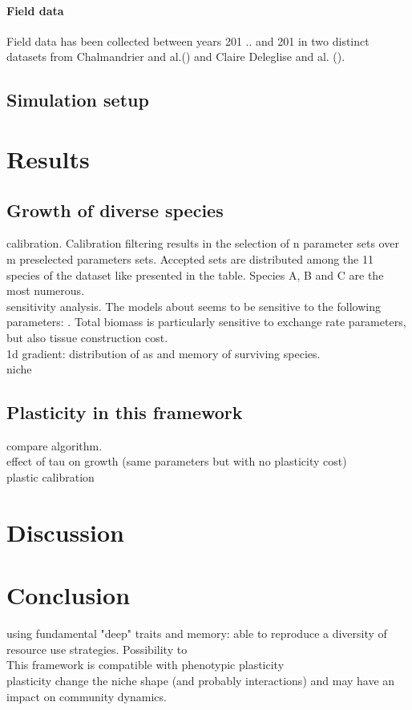 \documentclass[review]{elsarticle}
\begin{document}
\paragraph{Field data}
Field data has been collected between years 201 .. and 201 in two distinct datasets from Chalmandrier and al.() and Claire Deleglise and al. (). 
\subsection{Simulation setup}

\section{Results}
\subsection{Growth of diverse species}
calibration. Calibration filtering results in the selection of n parameter sets over m preselected parameters sets. Accepted sets are distributed among the 11 species of the dataset like presented in the table. Species A, B and C are the most numerous.\\
sensitivity analysis. The models about seems to be sensitive to the following parameters: . Total biomass is particularly sensitive to exchange rate parameters, but also tissue construction cost.\\
1d gradient: distribution of as and memory of surviving species.\\
niche\\

\subsection{Plasticity in this framework}
compare algorithm.\\
effect of tau on growth (same parameters but with no plasticity cost)\\
plastic calibration\\


\section{Discussion}

\section{Conclusion}
using fundamental "deep" traits and memory: able to reproduce a diversity of resource use strategies. Possibility to \\
This framework is compatible with phenotypic plasticity\\
plasticity change the niche shape (and probably interactions) and may have an impact on community dynamics.
\end{document}
